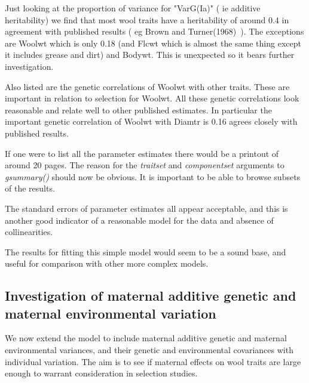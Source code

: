 \documentclass[titlepage]{article}  %
\begin{document}
Just looking at the proportion of variance for "VarG(Ia)" ( ie additive heritability) we find that most wool traits have a heritability of around 0.4 in agreement with published results ( eg Brown and Turner(1968)~\cite{brow:68}). The exceptions are Woolwt which is only 0.18 (and Flcwt which is almost the same thing except it includes grease and dirt) and Bodywt. This is unexpected so it bears further investigation.

Also listed are the genetic correlations of Woolwt with other traits. These are important in relation to selection for Woolwt.  All these genetic correlations look reasonable and relate well to other published estimates. In particular the important genetic correlation of Woolwt with Diamtr is 0.16 agrees closely with published results.

If one were to list all the parameter estimates there would be a printout of around 20 pages. The reason for the {\em traitset} and {\em componentset} arguments to {\em gsummary()} should now be obvious. It is important to be able to browse subsets of the results.

The standard errors of parameter estimates all appear acceptable, and this is another good indicator of a reasonable model for the data and absence of collinearities.

The results for fitting this simple model would seem to be a sound base, and useful for comparison with other more complex models.

\subsection{Investigation of maternal additive genetic and maternal environmental variation}
	We now extend the model to include maternal additive genetic and maternal environmental variances, and their genetic and environmental covariances with individual variation. The aim is to see if maternal effects on wool traits are large enough to warrant consideration in selection studies.
\end{document}
